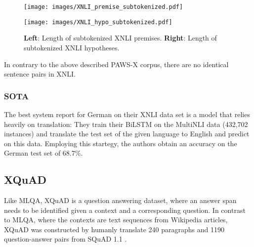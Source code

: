 

\begin{figure}
  \begin{minipage}{0.45\linewidth}
  \vspace{0pt}
    \texttt{[image: images/XNLI\_premise\_subtokenized.pdf]}
  \end{minipage}
  \hfill
  \begin{minipage}{0.45\linewidth}
  \vspace{0pt}
    \texttt{[image: images/XNLI\_hypo\_subtokenized.pdf]}
  \end{minipage}
  \label{fig:xnli-subtokenized}
  \caption[XNLI Lengths]{\textbf{Left}: Length of subtokenized XNLI premises. \textbf{Right}: Length of subtokenized XNLI hypotheses.}
\end{figure}


In contrary to the above described PAWS-X corpus, there are no identical sentence pairs in XNLI.

\subsubsection{SOTA}

The best system \cite{conneau2018xnli} report for German on their XNLI data set is a model that
relies heavily on translation:
They train their BiLSTM on the MultiNLI data (432,702 instances) and translate the test set of the
given language to English and predict on this data.
Employing this startegy, the authors obtain an accuracy on the German test set of 68.7\%.



\subsection{XQuAD}

Like MLQA, XQuAD \citep{artetxe2019cross} is a question answering dataset, where an answer span
needs to be identified given a context and a corresponding question. In contrast to MLQA, where the
contexts are text sequences from Wikipedia articles, XQuAD was constructed by humanly translate 240
paragraphs and 1190 question-answer pairs from SQuAD 1.1 \citep{rajpurkar2016squad}.

